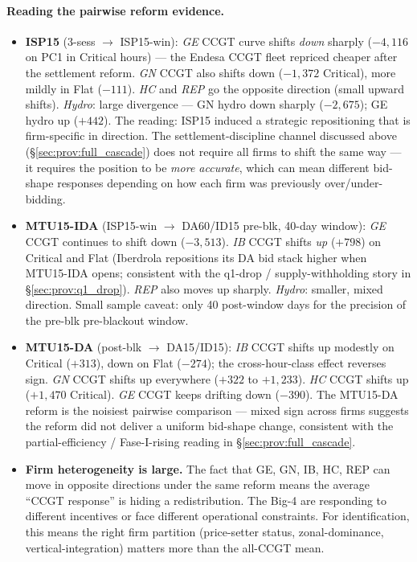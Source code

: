 \documentclass[11pt,a4paper]{article}
\begin{document}
\paragraph{Reading the pairwise reform evidence.}
\begin{itemize}
\item \textbf{ISP15} (3-sess $\to$ ISP15-win): \emph{GE} CCGT curve shifts \emph{down} sharply ($-4{,}116$ on PC1 in Critical hours) --- the Endesa CCGT fleet repriced cheaper after the settlement reform. \emph{GN} CCGT also shifts down ($-1{,}372$ Critical), more mildly in Flat ($-111$). \emph{HC} and \emph{REP} go the opposite direction (small upward shifts). \emph{Hydro}: large divergence --- GN hydro down sharply ($-2{,}675$); GE hydro up ($+442$). The reading: ISP15 induced a strategic repositioning that is firm-specific in direction. The settlement-discipline channel discussed above (\S\ref{sec:prov:full_cascade}) does not require all firms to shift the same way --- it requires the position to be \emph{more accurate}, which can mean different bid-shape responses depending on how each firm was previously over/under-bidding.
\item \textbf{MTU15-IDA} (ISP15-win $\to$ DA60/ID15 pre-blk, 40-day window): \emph{GE} CCGT continues to shift down ($-3{,}513$). \emph{IB} CCGT shifts \emph{up} ($+798$) on Critical and Flat (Iberdrola repositions its DA bid stack higher when MTU15-IDA opens; consistent with the q1-drop / supply-withholding story in §\ref{sec:prov:q1_drop}). \emph{REP} also moves up sharply. \emph{Hydro}: smaller, mixed direction. Small sample caveat: only 40 post-window days for the precision of the pre-blk pre-blackout window.
\item \textbf{MTU15-DA} (post-blk $\to$ DA15/ID15): \emph{IB} CCGT shifts up modestly on Critical ($+313$), down on Flat ($-274$); the cross-hour-class effect reverses sign. \emph{GN} CCGT shifts up everywhere ($+322$ to $+1{,}233$). \emph{HC} CCGT shifts up ($+1{,}470$ Critical). \emph{GE} CCGT keeps drifting down ($-390$). The MTU15-DA reform is the noisiest pairwise comparison --- mixed sign across firms suggests the reform did not deliver a uniform bid-shape change, consistent with the partial-efficiency / Fase-I-rising reading in §\ref{sec:prov:full_cascade}.
\item \textbf{Firm heterogeneity is large.} The fact that GE, GN, IB, HC, REP can move in opposite directions under the same reform means the average ``CCGT response'' is hiding a redistribution. The Big-4 are responding to different incentives or face different operational constraints. For identification, this means the right firm partition (price-setter status, zonal-dominance, vertical-integration) matters more than the all-CCGT mean.

\end{itemize}
\end{document}
